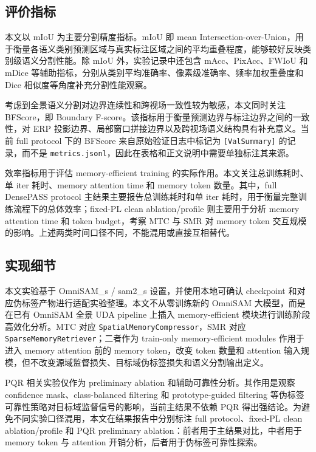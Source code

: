 \subsection{评价指标}
本文以 mIoU 为主要分割精度指标。mIoU 即 mean Intersection-over-Union，用于衡量各语义类别预测区域与真实标注区域之间的平均重叠程度，能够较好反映类别级语义分割性能。除 mIoU 外，实验记录中还包含 mAcc、PixAcc、FWIoU 和 mDice 等辅助指标，分别从类别平均准确率、像素级准确率、频率加权重叠度和 Dice 相似度等角度补充分割性能观察。

考虑到全景语义分割对边界连续性和跨视场一致性较为敏感，本文同时关注 BFScore，即 Boundary F-score。该指标用于衡量预测边界与标注边界之间的一致性，对 ERP 投影边界、局部窗口拼接边界以及跨视场语义结构具有补充意义。当前 full protocol 下的 BFScore 来自原始验证日志中标记为 \texttt{[ValSummary]} 的记录，而不是 \texttt{metrics.jsonl}，因此在表格和正文说明中需要单独标注其来源。

效率指标用于评估 memory-efficient training 的实际作用。本文关注总训练耗时、单 iter 耗时、memory attention time 和 memory token 数量。其中，full DensePASS protocol 主结果主要报告总训练耗时和单 iter 耗时，用于衡量完整训练流程下的总体效率；fixed-PL clean ablation/profile 则主要用于分析 memory attention time 和 token budget，考察 MTC 与 SMR 对 memory token 交互规模的影响。上述两类时间口径不同，不能混用或直接互相替代。

\subsection{实现细节}
本文实验基于 OmniSAM\_s / sam2\_s 设置，并使用本地可确认 checkpoint 和对应伪标签产物进行适配实验整理。本文不从零训练新的 OmniSAM 大模型，而是在已有 OmniSAM 全景 UDA pipeline 上插入 memory-efficient 模块进行训练阶段高效化分析。MTC 对应 \texttt{SpatialMemoryCompressor}，SMR 对应 \texttt{SparseMemoryRetriever}；二者作为 train-only memory-efficient modules 作用于进入 memory attention 前的 memory token，改变 token 数量和 attention 输入规模，但不改变源域监督损失、目标域伪标签损失和语义分割输出定义。

PQR 相关实验仅作为 preliminary ablation 和辅助可靠性分析。其作用是观察 confidence mask、class-balanced filtering 和 prototype-guided filtering 等伪标签可靠性策略对目标域监督信号的影响，当前主结果不依赖 PQR 得出强结论。为避免不同实验口径混用，本文在结果报告中分别标注 full protocol、fixed-PL clean ablation/profile 和 PQR preliminary ablation：前者用于主结果对比，中者用于 memory token 与 attention 开销分析，后者用于伪标签可靠性探索。

